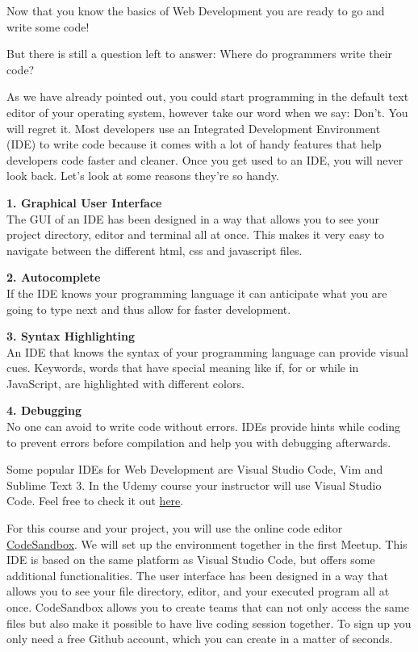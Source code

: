 \documentclass[
]{book}
\begin{document}
Now that you know the basics of Web Development you are ready to go and write some code!

But there is still a question left to answer: Where do programmers write their code?

As we have already pointed out, you could start programming in the default text editor of your operating system, however take our word when we say: Don't. You will regret it. Most developers use an Integrated Development Environment (IDE) to write code because it comes with a lot of handy features that help developers code faster and cleaner. Once you get used to an IDE, you will never look back. Let's look at some reasons they're so handy.

\textbf{1. Graphical User Interface}\\
The GUI of an IDE has been designed in a way that allows you to see your project directory, editor and terminal all at once. This makes it very easy to navigate between the different html, css and javascript files.

\textbf{2. Autocomplete}\\
If the IDE knows your programming language it can anticipate what you are going to type next and thus allow for faster development.

\textbf{3. Syntax Highlighting}\\
An IDE that knows the syntax of your programming language can provide visual cues. Keywords, words that have special meaning like if, for or while in JavaScript, are highlighted with different colors.

\textbf{4. Debugging}\\
No one can avoid to write code without errors. IDEs provide hints while coding to prevent errors before compilation and help you with debugging afterwards.

Some popular IDEs for Web Development are Visual Studio Code, Vim and Sublime Text 3. In the Udemy course your instructor will use Visual Studio Code. Feel free to check it out \href{https://code.visualstudio.com/}{here}.

For this course and your project, you will use the online code editor \href{https://codesandbox.io/}{CodeSandbox}. We will set up the environment together in the first Meetup. This IDE is based on the same platform as Visual Studio Code, but offers some additional functionalities. The user interface has been designed in a way that allows you to see your file directory, editor, and your executed program all at once. CodeSandbox allows you to create teams that can not only access the same files but also make it possible to have live coding session together. To sign up you only need a free Github account, which you can create in a matter of seconds.
\end{document}
